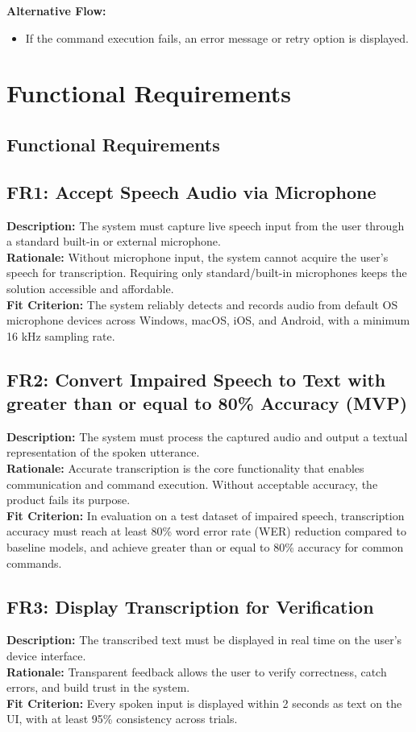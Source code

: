 \documentclass[12pt]{article}
\begin{document}
\textbf{Alternative Flow:}
\begin{itemize}
  \item If the command execution fails, an error message or retry option is displayed.
\end{itemize}


\section{Functional Requirements}
\subsection{Functional Requirements}

\subsection{FR1: Accept Speech Audio via Microphone}
\textbf{Description:} The system must capture live speech input from the user through a standard built-in or external microphone.\\
\textbf{Rationale:} Without microphone input, the system cannot acquire the user’s speech for transcription. Requiring only standard/built-in microphones keeps the solution accessible and affordable.\\
\textbf{Fit Criterion:} The system reliably detects and records audio from default OS microphone devices across Windows, macOS, iOS, and Android, with a minimum 16 kHz sampling rate.

\bigskip
\subsection{FR2: Convert Impaired Speech to Text with greater than or equal to 80\% Accuracy (MVP)}
\textbf{Description:} The system must process the captured audio and output a textual representation of the spoken utterance.\\
\textbf{Rationale:} Accurate transcription is the core functionality that enables communication and command execution. Without acceptable accuracy, the product fails its purpose.\\
\textbf{Fit Criterion:} In evaluation on a test dataset of impaired speech, transcription accuracy must reach at least 80\% word error rate (WER) reduction compared to baseline models, and achieve greater than or equal to 80\% accuracy for common commands.

\bigskip
\subsection{FR3: Display Transcription for Verification}
\textbf{Description:} The transcribed text must be displayed in real time on the user’s device interface.\\
\textbf{Rationale:} Transparent feedback allows the user to verify correctness, catch errors, and build trust in the system.\\
\textbf{Fit Criterion:} Every spoken input is displayed within 2 seconds as text on the UI, with at least 95\% consistency across trials.
\end{document}
